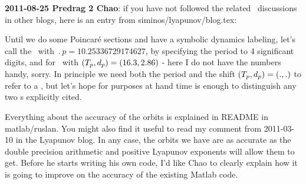 \begin{description}
{\bf 2011-08-25 Predrag 2 Chao}: if you have not followed the related
\KSe\ discussions in other blogs, here is an entry from
siminos/lyapunov/blog.tex:

Until we do some Poincar\'e sections and have a symbolic dynamics
labeling, let's call  the \po\ with
$\period{p}=10.25336729174627$, by specifying the period to 4 significant
digits, and  for \rpo\ with
$({T_{p}},d_p)=(16.3,2.86)$ - here I do not have the numbers
handy, sorry. In principle we need both the period and the shift
$({T_{p}},d_p)=(.,.)$ to refer to a \rpo, but let's hope for
purposes at hand time is enough to distinguish any two \rpo s explicitly
cited.

\item[2011-10-24 Ruslan 2 Predrag] Everything about the accuracy of the orbits is explained in README in matlab/ruslan.  You might also find it useful to read my comment from 2011-03-10 in the Lyapunov blog.  In any case, the orbits we have are as accurate as the double precision arithmetic and positive Lyapunov exponents will allow them to get.  Before he starts writing his own code, I'd like Chao to clearly explain how it is going to improve on the accuracy of the existing Matlab code.

\end{description}
